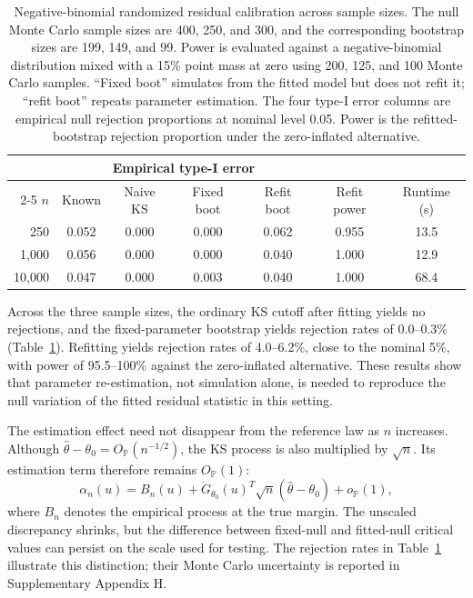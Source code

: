 \documentclass[preprint,12pt]{elsarticle}
\theoremstyle{plain}
\theoremstyle{remark}
\begin{document}
\begin{table}[!htbp]
\centering
\scriptsize
\caption{Negative-binomial randomized residual calibration across sample
sizes. The null Monte Carlo sample sizes are 400, 250, and 300, and the
corresponding bootstrap sizes are 199, 149, and 99. Power is evaluated against
a negative-binomial distribution mixed with a 15\% point mass at zero using 200, 125,
and 100 Monte Carlo samples. ``Fixed boot'' simulates from the fitted model but
does not refit it; ``refit boot'' repeats parameter estimation. The four
type-I error columns are empirical null rejection proportions at nominal
level 0.05. Power is the refitted-bootstrap rejection proportion under the
zero-inflated alternative.}
\label{tab:nb-scale}
\setlength{\tabcolsep}{3pt}
\begin{tabular}{@{}rcccccc@{}}
\toprule
 & \multicolumn{4}{c}{Empirical type-I error} & & \\
\cmidrule{2-5}
$n$ & Known & Naive KS & Fixed boot & Refit boot & Refit power & Runtime (s)\\
\midrule
250 & 0.052 & 0.000 & 0.000 & 0.062 & 0.955 & 13.5\\
1,000 & 0.056 & 0.000 & 0.000 & 0.040 & 1.000 & 12.9\\
10,000 & 0.047 & 0.000 & 0.003 & 0.040 & 1.000 & 68.4\\
\bottomrule
\end{tabular}
\end{table}

Across the three sample sizes, the ordinary KS cutoff after fitting yields
no rejections, and the fixed-parameter bootstrap yields rejection rates of
0.0--0.3\% (Table~\ref{tab:nb-scale}). Refitting yields rejection rates of
4.0--6.2\%, close to the nominal 5\%, with power of 95.5--100\% against the
zero-inflated alternative. These results show that parameter re-estimation,
not simulation alone, is needed to reproduce the null variation of the fitted
residual statistic in this setting.

The estimation effect need not disappear from the reference law as $n$
increases. Although $\widehat\theta-\theta_0=O_{\mathbb P}(n^{-1/2})$,
the KS process is also multiplied by $\sqrt n$. Its estimation term therefore
remains $O_{\mathbb P}(1)$:
\[
\alpha_n(u)=B_n(u)+\dot G_{\theta_0}(u)^T
\sqrt n(\widehat\theta-\theta_0)+o_{\mathbb P}(1),
\]
where $B_n$ denotes the empirical process at the true margin. The unscaled
discrepancy shrinks, but the difference between fixed-null and fitted-null
critical values can persist on the scale used for testing. The rejection
rates in Table~\ref{tab:nb-scale} illustrate this distinction; their Monte
Carlo uncertainty is reported in Supplementary Appendix H.
\end{document}
